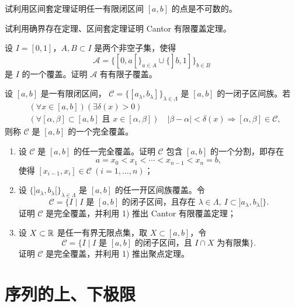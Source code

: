 \begin{exercise}
\item 试利用区间套定理证明任一有限闭区间 \([a,b]\) 的点是不可数的。
\end{exercise}

\begin{exercise}
\item 试利用确界存在定理、区间套定理证明 Cantor 有限覆盖定理。
\end{exercise}

\begin{exercise}
\item 设 \(I=[0,1]\)，\(A,B\subset I\) 是两个非空子集，使得
\[
\mathscr A=\{[0,a[\}_{a\in A}\cup\{]b,1]\}_{b\in B}
\]
是 \(I\) 的一个覆盖。证明 \(\mathscr A\) 有有限子覆盖。
\end{exercise}

\begin{exercise}
\item 设 \([a,b]\) 是一有限闭区间，
\(\mathscr C=\{[a_\lambda,b_\lambda]\}_{\lambda\in\Lambda}\)
是 \([a,b]\) 的一闭子区间族。若
\[
\begin{aligned}
&(\forall x\in[a,b])(\exists\delta(x)>0)\\
&(\forall[\alpha,\beta]\subset[a,b]\text{ 且 }x\in[\alpha,\beta])\quad
|\beta-\alpha|<\delta(x)\Longrightarrow[\alpha,\beta]\in\mathscr C,
\end{aligned}
\]
则称 \(\mathscr C\) 是 \([a,b]\) 的一个完全覆盖。
\begin{enumerate}[label=\arabic*)]
  \item 设 \(\mathscr C\) 是 \([a,b]\) 的任一完全覆盖。证明
  \(\mathscr C\) 包含 \([a,b]\) 的一个分割，即存在
  \[
  a=x_0<x_1<\cdots<x_{n-1}<x_n=b,
  \]
  使得 \([x_{i-1},x_i]\in\mathscr C\ (i=1,\ldots,n)\)；
  \item 设 \(\{]a_\lambda,b_\lambda[\}_{\lambda\in\Lambda}\)
  是 \([a,b]\) 的任一开区间族覆盖。令
  \[
  \mathscr C=\{I\mid I\text{ 是 }[a,b]\text{ 的闭子区间，且存在 }
  \lambda\in\Lambda,\ I\subset]a_\lambda,b_\lambda[\}.
  \]
  证明 \(\mathscr C\) 是完全覆盖，并利用 1) 推出 Cantor 有限覆盖定理；
  \item 设 \(X\subset\mathbb{R}\) 是任一有界无限点集，取 \(X\subset[a,b]\)，令
  \[
  \mathscr C=\{I\mid I\text{ 是 }[a,b]\text{ 的闭子区间，且 }I\cap X
  \text{ 为有限集}\}.
  \]
  证明 \(\mathscr C\) 是完全覆盖，并利用 1) 推出聚点定理。
\end{enumerate}
\end{exercise}

\section{序列的上、下极限}


